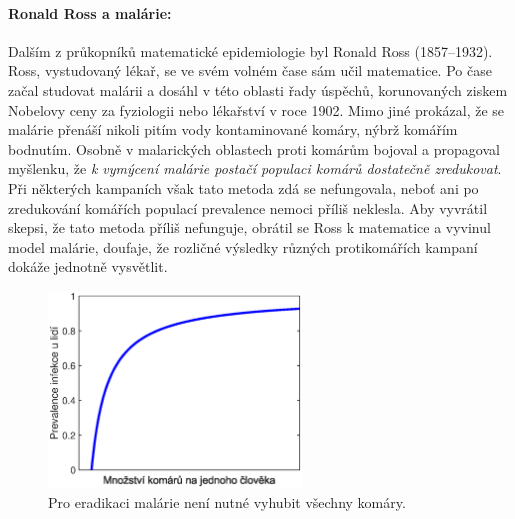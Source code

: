 
\paragraph{Ronald Ross a malárie:} Dalším z průkopníků matematické epidemiologie byl Ronald Ross (1857--1932). Ross, vystudovaný lékař, se ve svém volném čase sám učil matematice. Po čase začal studovat malárii a dosáhl v této oblasti řady úspěchů, korunovaných ziskem Nobelovy ceny za fyziologii nebo lékařství v roce 1902. Mimo jiné prokázal, že se malárie přenáší nikoli pitím vody kontaminované komáry, nýbrž komářím bodnutím. Osobně v malarických oblastech proti komárům bojoval a propagoval myšlenku, že \emph{k vymýcení malárie postačí populaci komárů dostatečně zredukovat}. Při některých kampaních však tato metoda zdá se nefungovala, neboť ani po zredukování komářích populací prevalence nemoci příliš neklesla. Aby vyvrátil skepsi, že tato metoda příliš nefunguje, obrátil se Ross k matematice a vyvinul model malárie, doufaje, že rozličné výsledky různých protikomářích kampaní dokáže jednotně vysvětlit. 

\begin{figure}[h]
\begin{center}
	\includegraphics[width=0.6\textwidth]{pic/ross_plot.eps}
\end{center}
\caption{Pro eradikaci malárie není nutné vyhubit všechny komáry.}
\label{ross1}
\end{figure}

